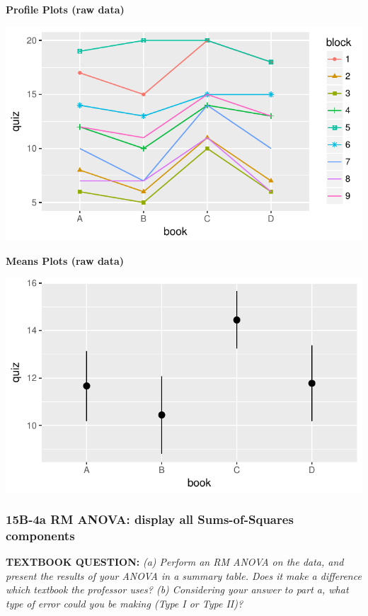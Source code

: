 \documentclass[]{article}
\begin{document}
\textbf{Profile Plots (raw data)}

\begin{center}\includegraphics{Unit_5_assignment_KEY_R__spr18__files/figure-latex/unnamed-chunk-13-1} \end{center}

\textbf{Means Plots (raw data)}

\begin{center}\includegraphics{Unit_5_assignment_KEY_R__spr18__files/figure-latex/unnamed-chunk-14-1} \end{center}

\clearpage

\subsubsection{15B-4a RM ANOVA: display all Sums-of-Squares
components}\label{b-4a-rm-anova-display-all-sums-of-squares-components}

\textbf{TEXTBOOK QUESTION:} \emph{(a) Perform an RM ANOVA on the data,
and present the results of your ANOVA in a summary table. Does it make a
difference which textbook the professor uses? (b) Considering your
answer to part a, what type of error could you be making (Type I or Type
II)?}
\end{document}
